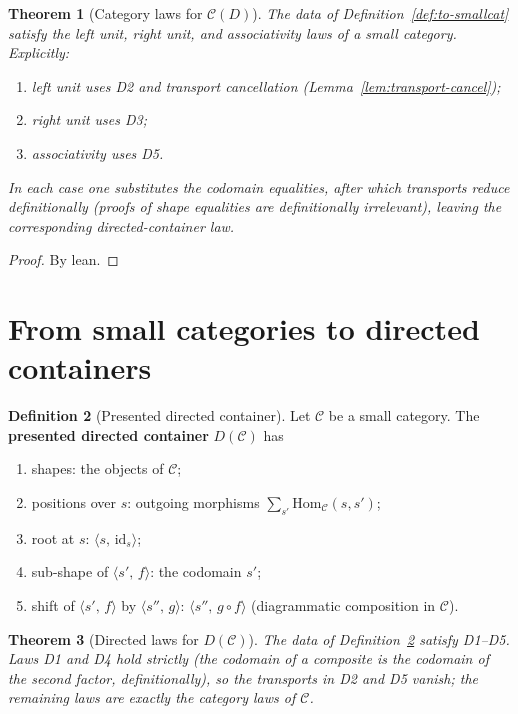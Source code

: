 \documentclass[11pt,a4paper]{article}
\theoremstyle{plain}
\newtheorem{theorem}{Theorem}[section]
\theoremstyle{definition}
\newtheorem{definition}[theorem]{Definition}
\newcommand{\id}{\mathrm{id}}
\newcommand{\cat}{\mathcal{C}}
\newcommand{\Hom}{\mathrm{Hom}}
\begin{document}
\begin{theorem}[Category laws for $\cat(D)$]\label{thm:cat-laws}
The data of Definition~\ref{def:to-smallcat} satisfy the left unit, right
unit, and associativity laws of a small category. Explicitly:
\begin{enumerate}
  \item left unit uses D2 and transport cancellation
        (Lemma~\ref{lem:transport-cancel});
  \item right unit uses D3;
  \item associativity uses D5.
\end{enumerate}
In each case one substitutes the codomain equalities, after which transports
reduce definitionally (proofs of shape equalities are definitionally
irrelevant), leaving the corresponding directed-container law.
\end{theorem}

\begin{proof}
By lean.
\end{proof}

\section{From small categories to directed containers}

\begin{definition}[Presented directed container]\label{def:to-dcont}
Let $\mathcal{C}$ be a small category. The \textbf{presented directed
container} $D(\mathcal{C})$ has
\begin{enumerate}
  \item shapes: the objects of $\mathcal{C}$;
  \item positions over $s$: outgoing morphisms
        $\sum_{s'}\Hom_{\mathcal{C}}(s,s')$;
  \item root at $s$: $\langle s,\,\id_s\rangle$;
  \item sub-shape of $\langle s',\,f\rangle$: the codomain $s'$;
  \item shift of $\langle s',\,f\rangle$ by $\langle s'',\,g\rangle$:
        $\langle s'',\, g\circ f\rangle$ (diagrammatic composition in
        $\mathcal{C}$).
\end{enumerate}
\end{definition}

\begin{theorem}[Directed laws for $D(\mathcal{C})$]\label{thm:d-laws}
The data of Definition~\ref{def:to-dcont} satisfy D1--D5. Laws D1 and D4 hold
strictly (the codomain of a composite is the codomain of the second factor,
definitionally), so the transports in D2 and D5 vanish; the remaining laws are
exactly the category laws of $\mathcal{C}$.
\end{theorem}
\end{document}
